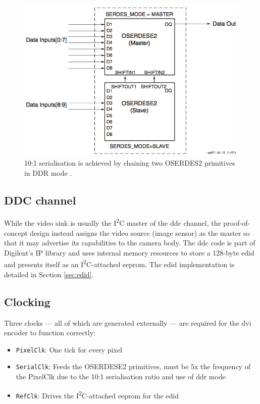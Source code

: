 \begin{figure}
  \centering
  \includegraphics[width=1\textwidth]{./img/10_1_serdes.png}
  \caption{10:1 serialisation is achieved by chaining two OSERDES2 primitives in DDR mode \cite{xilinx:ug471}.}
  \label{fig:10_1_serdes}
\end{figure}

\subsection{DDC channel}

While the video sink is usually the I\textsuperscript{2}C master of the \gls{ddc} channel, the proof-of-concept design instead assigns the video source (image sensor) as the master so that it may advertise its capabilities to the camera body. The \gls{ddc} code is part of Digilent's IP library and uses internal memory resources to store a 128-byte \gls{edid} and presents itself as an I\textsuperscript{2}C-attached \gls{eeprom}. The \gls{edid} implementation is detailed in Section \ref{sec:edid}.

\subsection{Clocking}
Three clocks --- all of which are generated externally --- are required for the \gls{dvi} encoder to function correctly:
\begin{itemize}
    \item \texttt{PixelClk}: One tick for every pixel
    \item \texttt{SerialClk}: Feeds the OSERDESE2 primitives, must be 5x the frequency of the PixelClk due to the 10:1 serialisation ratio and use of \gls{ddr} mode
    \item \texttt{RefClk}: Drives the I\textsuperscript{2}C-attached \gls{eeprom} for the \gls{edid}
\end{itemize}

